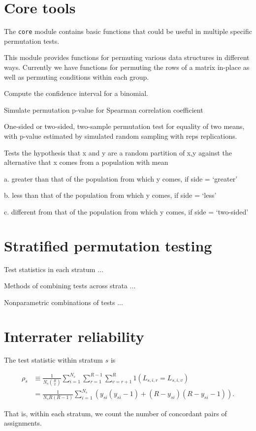 \section{Core tools}

The \texttt{core} module contains basic functions that could be useful in
multiple specific permutation tests.  

This module provides functions for permuting various data structures in
different ways.  Currently we have functions for permuting the rows of
a matrix in-place as well as permuting conditions within each group.


Compute the confidence interval for a binomial.


Simulate permutation p-value for Spearman correlation coefficient


One-sided or two-sided, two-sample permutation test for equality of two means,
with p-value estimated by simulated random sampling with reps replications.

Tests the hypothesis that x and y are a random partition of x,y against the
alternative that x comes from a population with mean

a. greater than that of the population from which y comes, if side = ‘greater’

b. less than that of the population from which y comes, if side = ‘less’

c. different from that of the population from which y comes, if side = ‘two-sided’

\section{Stratified permutation testing}

Test statistics in each stratum ...

Methods of combining tests across strata ...

Nonparametric combinations of tests ...

\section{\label{sec:irr}Interrater reliability}

The test statistic within stratum $s$ is

\begin{align*}
\rho_s &\equiv \frac{1}{N_s {R \choose 2}} \sum_{i=1}^{N_s}
              \sum_{r=1}^{R-1} \sum_{v=r+1}^R 1(L_{s,i,r} = L_{s,i,v}) \\
       &= \frac{1}{N_s R(R-1)} \sum_{i=1}^{N_s}
                (y_{si}(y_{si}-1) + (R-y_{si})(R-y_{si}-1)).
\end{align*}

That is, within each stratum, we count the number of concordant pairs of
assignments.

